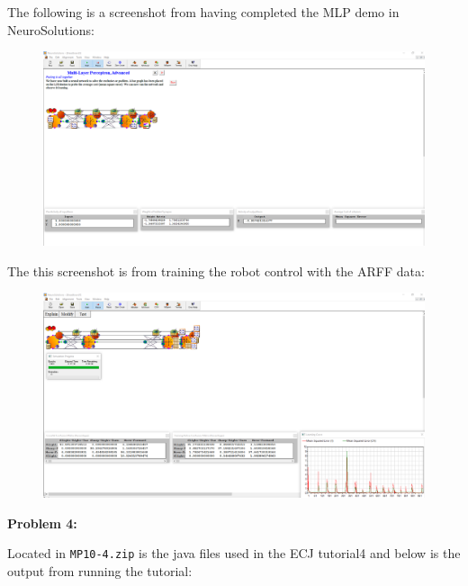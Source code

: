 \documentclass{amsart}
\theoremstyle{definition}
\begin{document}
The following is a screenshot from having completed the MLP demo in NeuroSolutions:

\begin{figure}[h!]
    \includegraphics[width=0.9\linewidth]{mp9-3_0}
\end{figure}


The this screenshot is from training the robot control with the ARFF data:

\begin{figure}[h!]
    \includegraphics[width=0.9\linewidth]{mp9-3_1}
\end{figure}


\bigbreak
\textbf{Problem 4:}
\bigbreak

Located in {\tt MP10-4.zip} is the java files used in the ECJ tutorial4 and below is the output from running the tutorial:
\end{document}
